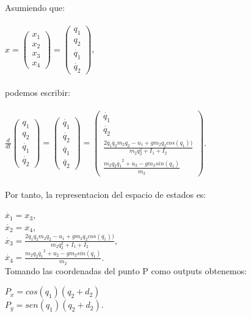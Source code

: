 \documentclass{article}
\begin{document}
\begin{itemize}
Asumiendo que:\\\\
		$x = 
			\begin{pmatrix}
				 x_1\\x_2\\x_3\\x_4
			\end{pmatrix}
		 		= 
			\begin{pmatrix}
				 q_1\\q_2\\\dot{q_1}\\\dot{q_2}
			\end{pmatrix}$,\\\\
podemos escribir:\\\\
		$\frac{d}{dt}
			\begin{pmatrix}
				 q_1\\q_2\\\dot{q_1}\\\dot{q_2}
			\end{pmatrix}
				=
			\begin{pmatrix}
				 \dot{q_1}\\\dot{q_2}\\\ddot{q_1}\\\ddot{q_2}
			\end{pmatrix}
				=
			\begin{pmatrix}
				 \dot{q_1}\\\dot{q_2}\\\frac{2\dot{q_1}\dot{q_2}m_2q_2 - u_1 + gm_2q_2cos(q_1))}{m_2q_2^2 + I_1 + I_2}\\\frac{m_2q_2\dot{q_1}^2 + u_2 - gm_2sin(q_1)}{m_2}
			\end{pmatrix}$.\\\\
Por tanto, la representacion del espacio de estados es:

	$\dot{x_1}=x_3$,\\
	$\dot{x_2}=x_4$,\\
	$\dot{x_3}=\frac{2\dot{q_1}\dot{q_2}m_2q_2 - u_1 + gm_2q_2cos(q_1))}{m_2q_2^2 + I_1 + I_2}$,\\
	$\dot{x_4}=\frac{m_2q_2\dot{q_1}^2 + u_2 - gm_2sin(q_1)}{m_2}$.\\
	
Tomando las coordenadas del punto P como outputs obtenemos:

$P_x = cos(q_1)(q_2+d_2)$\\
$P_y = sen(q_1)(q_2+d_2)$.


\end{itemize}
\end{document}
